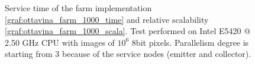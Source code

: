 \begin{figure}[p]
\centering
{}
\caption{ Service time of the farm implementation \ref{graf:ottavina_farm_1000_time} and relative scalability \ref{graf:ottavina_farm_1000_scala}. Test performed on Intel E5420 @ 2.50 GHz CPU with images of $10^6$ 8bit pixels. Parallelism degree is starting from 3 because of the service nodes (emitter and collector). }
\label{chart:ottavina_farm_1000}
\end{figure}

